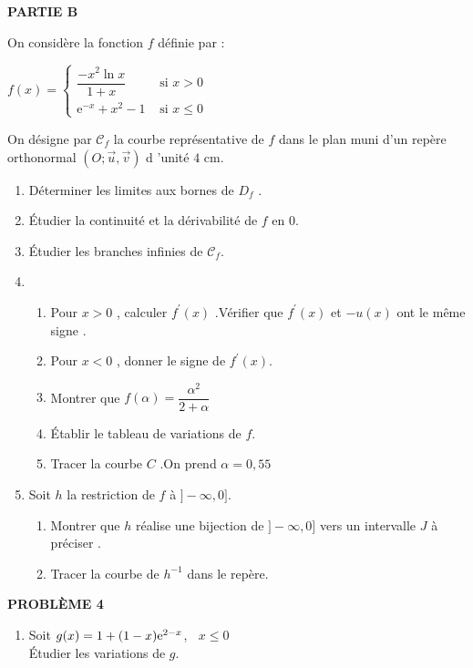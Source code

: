 \begin{enumerate}
 
 \textbf{PARTIE B}
 
  On considère  la fonction $ f $ définie par :\medskip
  
   $f(x)=\begin{cases}  
\dfrac{-x^{2}\ln x}{1 +x} & \text{ si } x > 0 \\[0.25cm]
\text{e}^{-x}  + x^{2}- 1  & \text{ si }  x \leq 0  
\end{cases} $ 


 On désigne par $\mathscr{C}_{f}$ la courbe représentative de $ f $ dans le plan muni d'un repère orthonormal $(O ;\overrightarrow{u},\overrightarrow{v})$ d 'unité $ 4  $ cm.
 
 \begin{enumerate}
 \item Déterminer les limites aux bornes de $ D_{f}$ .
 \item  Étudier la continuité et la dérivabilité de $ f $ en $ 0 $.
 \item Étudier les branches infinies de $\mathscr{C}_{f}$.
 \item 
 \begin{enumerate}
 \item Pour $ x > 0 $ , calculer $ f^{'}(x)  $ .Vérifier que $ f^{'}(x) $ et $- u(x) $ ont le même signe .
 \item Pour $ x < 0 $ , donner le signe de  $ f^{'}(x) $.
 \item Montrer que $ f(\alpha)=\dfrac{\alpha^{2}}{2+\alpha} $ 
 \item Établir le tableau de variations de  $ f $.
 \item Tracer la courbe $ C $ .On prend $ \alpha = 0,55 $ 
 \end{enumerate}
 \item Soit $ h $ la restriction de $ f $ à $ ]-\infty , 0] $.
 \begin{enumerate}
 \item Montrer que $ h $ réalise une bijection de $ ]-\infty , 0] $ vers un intervalle $ J $ à préciser .
 \item Tracer la courbe de  $ h^{-1 } $ dans le repère.
 \end{enumerate}
 \end{enumerate}

\vspace{0,5cm}

\textbf{PROBLÈME 4}

\vspace{0,2cm}

\begin{enumerate}
\item Soit $ g(x)=1+(1-x)\mathrm{e}^{2-x} $,\; $\;\; x\leq0 $\\ Étudier les variations de $ g $. 


\end{enumerate}
\end{enumerate}
